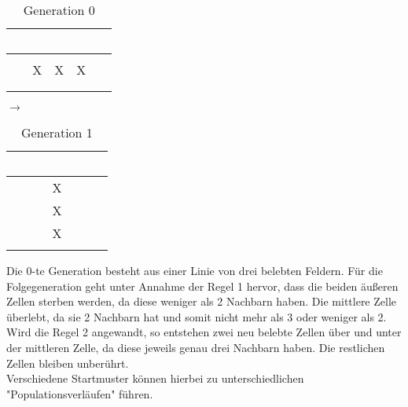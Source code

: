\begin{minipage}{.45\textwidth}
	\begin{table}[H]
		\center
		\begin{tabular}{|c|c|c|c|c|}
			\hline
			~   & ~ & ~ & ~ & ~ \\ \hline
			&   &   &   &  \\ \hline
			& X & X & X &  \\ \hline
			&   &   &  &  \\ \hline
			&   &   &   &  \\ \hline
		\end{tabular}
		\caption*{Generation 0}
	\end{table}
\end{minipage}
\begin{minipage}{0.1\textwidth}
	\center
	\large
$\longrightarrow$
\end{minipage}
\begin{minipage}{.45\textwidth}
\begin{table}[H]
	\center
	\begin{tabular}{|c|c|c|c|c|}
		\hline
		~   & ~ & ~ & ~ & ~ \\ \hline
		&   & X &   &  \\ \hline
		&   & X &   &  \\ \hline
		&   & X &   &  \\ \hline
		&   &   &   &  \\ \hline
	\end{tabular}
	\caption*{Generation 1}
\end{table}
\end{minipage}


Die 0-te Generation besteht aus einer Linie von drei belebten Feldern. Für die Folgegeneration geht unter Annahme der Regel 1 hervor, dass die beiden äußeren Zellen sterben werden, da diese weniger als 2 Nachbarn haben. Die mittlere Zelle überlebt, da sie 2 Nachbarn hat und somit nicht mehr als 3 oder weniger als 2.\\
Wird die Regel 2 angewandt, so entstehen zwei neu belebte Zellen über und unter der mittleren Zelle, da diese jeweils genau drei Nachbarn haben. Die restlichen Zellen bleiben unberührt. \\
Verschiedene Startmuster können hierbei zu unterschiedlichen "Populationsverläufen" führen. 



